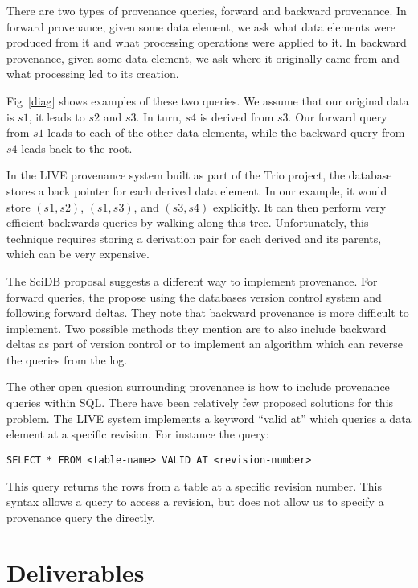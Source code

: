 \documentclass{article}
\begin{document}
There are two types of provenance queries, forward and backward provenance. In forward provenance, given some data element, we ask what data elements were produced from it and what processing operations were applied to it. In backward provenance, given some data element, we ask where it originally came from and what processing led to its creation. 

Fig~\ref{diag} shows examples of these two queries. We assume that our original data is $s1$, it leads to $s2$ and $s3$. In turn, $s4$ is derived from $ s3$. Our forward query from $ s1$ leads to each of the other data elements, while the backward query from  $s4$ leads back to the root.  

In the LIVE provenance system built as part of the Trio project, the database stores a back pointer for each derived data element. In our example, it would store $(s1, s2)$, $(s1, s3)$, and $(s3, s4)$ explicitly. It can then perform very efficient backwards queries by walking along this tree. Unfortunately, this technique requires storing a derivation pair for each derived and its parents, which can be very expensive.  

The SciDB proposal suggests a different way to implement provenance. For forward queries, the propose using the databases version control system and following forward deltas. They note that backward provenance is more difficult to implement. Two possible methods they mention are to also include backward deltas as part of version control or to implement an algorithm which can reverse the queries from the log. 

The other open quesion surrounding provenance is how to include provenance queries within SQL. There have been relatively few proposed solutions for this problem. The LIVE system implements a keyword ``valid at'' which queries a data element at a specific revision. For instance the query:

\begin{verbatim}
SELECT * FROM <table-name> VALID AT <revision-number>
\end{verbatim}

This query returns the rows from a table at a specific revision number. This syntax allows a query to access a revision, but does not allow us to specify a provenance query the directly. 


\section{Deliverables}
\end{document}
